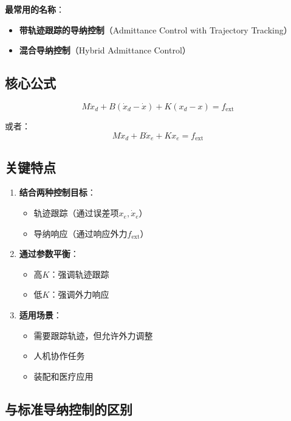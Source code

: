 \documentclass[12pt,a4paper]{article}
\begin{document}
\textbf{最常用的名称}：
\begin{itemize}
\item \textbf{带轨迹跟踪的导纳控制}（Admittance Control with Trajectory Tracking）
\item \textbf{混合导纳控制}（Hybrid Admittance Control）
\end{itemize}

\subsection{核心公式}

\begin{equation}
M\ddot{x}_d + B(\dot{x}_d - \dot{x}) + K(x_d - x) = f_{\text{ext}}
\end{equation}

或者：
\begin{equation}
M\ddot{x}_d + B\dot{x}_e + Kx_e = f_{\text{ext}}
\end{equation}

\subsection{关键特点}

\begin{enumerate}
\item \textbf{结合两种控制目标}：
\begin{itemize}
\item 轨迹跟踪（通过误差项$x_e, \dot{x}_e$）
\item 导纳响应（通过响应外力$f_{\text{ext}}$）
\end{itemize}

\item \textbf{通过参数平衡}：
\begin{itemize}
\item 高$K$：强调轨迹跟踪
\item 低$K$：强调外力响应
\end{itemize}

\item \textbf{适用场景}：
\begin{itemize}
\item 需要跟踪轨迹，但允许外力调整
\item 人机协作任务
\item 装配和医疗应用
\end{itemize}
\end{enumerate}

\subsection{与标准导纳控制的区别}
\end{document}
